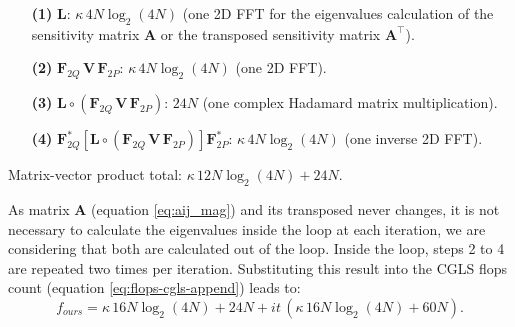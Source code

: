 \begin{itemize}
\item[\textbf{(1)}] $\mathbf{L}$: $\kappa  \, 4 N \log_2(4N)$ (one 2D FFT for the eigenvalues calculation of the sensitivity matrix $\mathbf{A}$ or the transposed sensitivity matrix $\mathbf{A}^{\top}$).

\item[\textbf{(2)}] $\mathbf{F}_{2Q} \, \mathbf{V} \, \mathbf{F}_{2P}$: $\kappa  \, 4 N \log_2(4N)$ (one 2D FFT).

\item[\textbf{(3)}] $\mathbf{L} \circ \left(\mathbf{F}_{2Q} \, \mathbf{V} \, \mathbf{F}_{2P} \right)$: $24 N$ (one complex Hadamard matrix multiplication).

\item[\textbf{(4)}] $\mathbf{F}_{2Q}^{\ast} \left[ 
\mathbf{L} \circ \left(\mathbf{F}_{2Q} \, \mathbf{V} \, \mathbf{F}_{2P} \right) 
\right] \mathbf{F}_{2P}^{\ast}$: $\kappa  \, 4 N \log_2(4N)$ (one inverse 2D FFT).
\end{itemize}
Matrix-vector product total:  $\kappa  \, 12 N \log_2(4 N) + 24 N$.

As matrix $\mathbf{A}$ (equation \ref{eq:aij_mag}) and its transposed never changes, it is not necessary to calculate the eigenvalues inside the loop at each iteration, we are considering that both are calculated out of the loop. Inside the loop, steps 2 to 4 are repeated two times per iteration. Substituting this result into the CGLS flops count (equation \ref{eq:flops-cgls-append}) leads to:
\begin{equation}
f_{ours} =  \kappa  \, 16 N \log_2(4 N) + 24 N + it \, (\kappa  \, 16 N \log_2 (4 N) + 60 N).
\label{eq:flops-cgls-bccb-append}
\end{equation}
